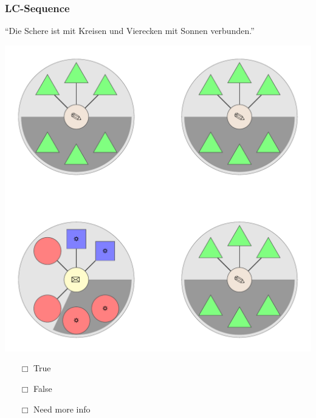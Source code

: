 \documentclass[fleqn,10pt,serif,xcolor=dvipsnames]{beamer}
\newcommand{\LC}{LC\xspace}
\newcommand{\mymark}[1]{{\color{blue}{#1}}}
\begin{document}
\begin{frame}
  \frametitle{\LC-Sequence}
  \begin{center}
    ``Die Schere ist mit Kreisen und Vierecken mit Sonnen verbunden.''

    \vspace{0.1cm}

    \includegraphics[width=0.5 \textwidth]{../../pictures/lc_01_3.pdf}

    \vspace{0.1cm}

    \begin{multicols}{3}
      \begin{itemize} 
      \item[$\Box$] True\\
        \onslide<2>{$\leadsto$  \mymark{LC}}
      \item[$\Box$] False\\
        \onslide<2>{$\leadsto$ \mymark{false}}
      \item[$\Box$] Need more info 
      \end{itemize}
    \end{multicols}

  \end{center}
\end{frame}
\end{document}
